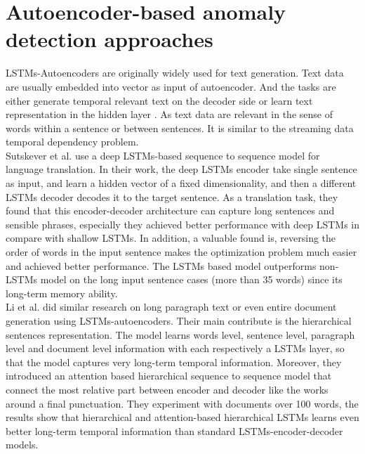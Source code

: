 \section{Autoencoder-based anomaly detection approaches}
\label{sec:Autoencoder-based anomaly detection approaches}

LSTMs-Autoencoders are originally widely used for text generation. Text data are usually embedded into vector as input of autoencoder. And the tasks are either generate temporal relevant text on the decoder side or learn text representation in the hidden layer \cite{phraserepresentation}. As text data are relevant in the sense of words within a sentence or between sentences. It is similar to the streaming data temporal dependency problem.\\

Sutskever et al. \cite{seq2seq} use a deep LSTMs-based sequence to sequence model for language translation. In their work, the deep LSTMs encoder take single sentence as input, and learn a hidden vector of a fixed dimensionality, and then a different LSTMs decoder decodes it to the target sentence.  As a translation task, they found that this encoder-decoder architecture can capture long sentences and sensible phrases, especially they achieved better performance with deep LSTMs in compare with shallow LSTMs. In addition, a valuable found is, reversing the order of words in the input sentence makes the optimization problem much easier and achieved better performance. The LSTMs based model outperforms non-LSTMs model on the long input sentence cases (more than 35 words) since its long-term memory ability.\\

Li et al. \cite{hierarchicalseq2seq} did similar research on long paragraph text or even entire document generation using LSTMs-autoencoders. Their main contribute is the hierarchical sentences representation. The model learns words level, sentence level, paragraph level and document level information with each respectively a LSTMs layer, so that the model captures very long-term temporal information. Moreover, they introduced an attention based hierarchical sequence to sequence model that connect the most relative part between encoder and decoder like the works around a final punctuation. They experiment with documents over 100 words, the results show that hierarchical and attention-based hierarchical LSTMs learns even better long-term temporal information than standard LSTMs-encoder-decoder models.\\

